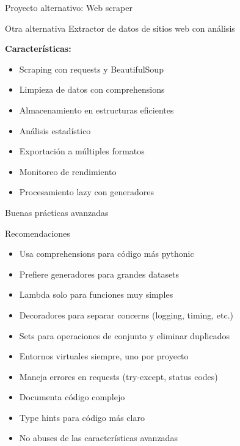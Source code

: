 \documentclass{beamer}
\begin{document}
\begin{frame}{Proyecto alternativo: Web scraper \faSpider}
\begin{conceptbox}{Otra alternativa}
Extractor de datos de sitios web con análisis
\end{conceptbox}

\textbf{Características:}
\small
\begin{itemize}
    \item[\faGlobe] Scraping con requests y BeautifulSoup
    \item[\faFilter] Limpieza de datos con comprehensions
    \item[\faDatabase] Almacenamiento en estructuras eficientes
    \item[\faChartLine] Análisis estadístico
    \item[\faFileExport] Exportación a múltiples formatos
    \item[\faStopwatch] Monitoreo de rendimiento
    \item[\faRecycle] Procesamiento lazy con generadores
\end{itemize}
\end{frame}

\begin{frame}{Buenas prácticas avanzadas \faCheckDouble}
\begin{conceptbox}{Recomendaciones}
\small
\begin{itemize}
    \item[\faCheck] Usa comprehensions para código más pythonic
    \item[\faCheck] Prefiere generadores para grandes datasets
    \item[\faCheck] Lambda solo para funciones muy simples
    \item[\faCheck] Decoradores para separar concerns (logging, timing, etc.)
    \item[\faCheck] Sets para operaciones de conjunto y eliminar duplicados
    \item[\faCheck] Entornos virtuales siempre, uno por proyecto
    \item[\faCheck] Maneja errores en requests (try-except, status codes)
    \item[\faCheck] Documenta código complejo
    \item[\faCheck] Type hints para código más claro
    \item[\faCheck] No abuses de las características avanzadas
\end{itemize}
\end{conceptbox}
\end{frame}
\end{document}
